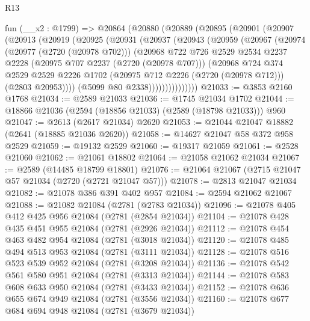 \begin{lexlean}{R13}
\begin{coremodule}
    fun (__x2 : @1799) =>
    @20864
      (@20880
        (@20889
          (@20895
            (@20901
              (@20907
                (@20913
                  (@20919
                    (@20925
                      (@20931
                        (@20937
                          (@20943
                            (@20959
                              (@20967
                                (@20974
                                  (@20977 (@2720 (@20978 @702)))
                                  (@20968
                                    @722
                                    @726
                                    @2529
                                    @2534
                                    @2237
                                    @2228
                                    (@20975 @707 @2237 (@2720 (@20978 @707)))
                                    (@20968
                                      @724
                                      @374
                                      @2529
                                      @2529
                                      @2226
                                      @1702
                                      (@20975 @712 @2226 (@2720 (@20978 @712)))
                                      (@2803 @20953))))
                                (@5099 @80 @2338)))))))))))))))
@21033 := @3853 @2160 @1768
@21034 := @2589 @21033
@21036 := @1745 @21034 @1702
@21044 := @18866 @21036 (@2594 (@18856 @21033) (@2589 (@18798 @21033))) @960
@21047 := @2613 (@2617 @21034) @2620
@21053 := @21044 @21047 @18882 (@2641 (@18885 @21036 @2620))
@21058 := @14627 @21047 @58 @372 @958 @2529
@21059 := @19132 @2529
@21060 := @19317 @21059
@21061 := @2528 @21060
@21062 := @21061 @18802
@21064 := @21058 @21062 @21034
@21067 := @2589 (@14485 @18799 @18801)
@21076 := @21064 @21067 (@2715 @21047 @57 @21034 (@2720 (@2721 @21047 @57)))
@21078 := @2813 @21047 @21034
@21082 := @21078 @386 @391 @402 @957
@21084 := @2594 @21062 @21067
@21088 := @21082 @21084 (@2781 (@2783 @21034))
@21096 := @21078 @405 @412 @425 @956 @21084 (@2781 (@2854 @21034))
@21104 := @21078 @428 @435 @451 @955 @21084 (@2781 (@2926 @21034))
@21112 := @21078 @454 @463 @482 @954 @21084 (@2781 (@3018 @21034))
@21120 := @21078 @485 @494 @513 @953 @21084 (@2781 (@3111 @21034))
@21128 := @21078 @516 @523 @539 @952 @21084 (@2781 (@3208 @21034))
@21136 := @21078 @542 @561 @580 @951 @21084 (@2781 (@3313 @21034))
@21144 := @21078 @583 @608 @633 @950 @21084 (@2781 (@3433 @21034))
@21152 := @21078 @636 @655 @674 @949 @21084 (@2781 (@3556 @21034))
@21160 := @21078 @677 @684 @694 @948 @21084 (@2781 (@3679 @21034))

\end{coremodule}
\end{lexlean}
